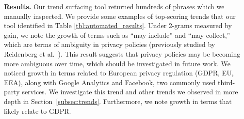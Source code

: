 \begin{table}[]
\centering
{}
\caption{The top five results from three categories of our automated trend surfacing tool. Scoring functions: ``gain,'' is the difference between the lowest and highest frequency; ``pos slope 2,'' is the maximum slope over any two intervals.}
\label{tbl:automated_results}
\end{table}

\textbf{Results.} Our trend surfacing tool returned hundreds of phrases which we manually inspected. 
We provide some examples of top-scoring trends that our tool identified in Table \ref{tbl:automated_results}. Under 2-grams measured by gain, we note the growth of terms such as ``may include'' and ``may collect,'' which are terms of ambiguity in privacy policies (previously studied by Reidenberg et al.~\cite{reidenberg2016ambiguity}). This result suggests that privacy policies may be becoming more ambiguous over time, which should be investigated in future work. We noticed growth in terms related to European privacy regulation (GDPR, EU, EEA), along with Google Analytics and Facebook, two commonly used third-party services. We investigate this trend and other trends we observed in more depth in Section~\ref{subsec:trends}. Furthermore, we note growth in terms that likely relate to GDPR.


